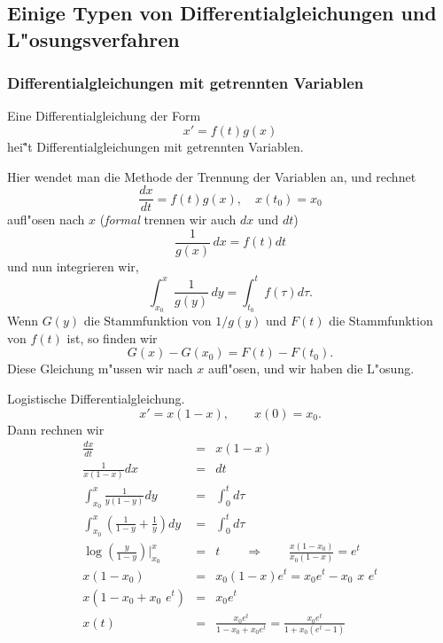 \subsection{Einige Typen von  Differentialgleichungen und L"osungsverfahren}
\subsubsection{Differentialgleichungen mit getrennten Variablen}
\begin{sdefi} Eine Differentialgleichung der Form
$$ x' = f(t) g(x)$$
hei\""{}t Differentialgleichungen mit getrennten Variablen.
\end{sdefi}
Hier wendet man die Methode der Trennung der Variablen an, und rechnet
$$ \frac {d x}{dt} = f(t) g(x),\quad x(t_0) = x_0$$
aufl"osen nach $x$ ({\it formal} trennen wir auch $dx$ und $dt$)
$$ \frac {1}{g(x)}\, dx = f(t) dt$$
und nun integrieren wir,
$$ \int_{x_0}^x\frac {1}{g(y)}\, dy = \int_{t_0}^tf(\tau) d\tau.$$
Wenn $G(y)$ die Stammfunktion von $1/g(y)$ und $F(t)$ die Stammfunktion von $f(t)$ ist,
so finden wir
$$ G(x)-G(x_0) = F(t)-F(t_0).$$
Diese Gleichung m"ussen wir nach $x$ aufl"osen, und wir haben die L"osung.
\begin{bspX}
Logistische Differentialgleichung.
$$ x' = x(1-x),\qquad x(0) = x_0.$$
Dann rechnen wir
\begin{eqnarray*}
\frac {dx}{dt} & = & x (1-x)\\
\frac {1}{x(1-x)}dx & = & dt\\
\int_{x_0}^x  \frac {1}{y(1-y)}dy & = & \int_0^td\tau\\
\int_{x_0}^x  \left(\frac {1}{1-y} +\frac{1}{y}\right) dy & = & \int_0^td\tau\\
\log(\frac{y}{1-y})\bigg|_{x_0}^x   & = & t
\qquad\Rightarrow\qquad
\frac{x(1-x_0)}{x_0(1-x)} = e^t\\
x(1-x_0) &=& x_0(1-x)e^t = x_0 e^t- x_0\,\, x\,\, e^t\\
x\left(1-x_0+x_0\,\, e^t\right) &=& x_0 e^t
\\
x(t)
 &=& \frac{x_0 e^t}{1-x_0+x_0e^t} 
 = \frac{x_0 e^t}{1+x_0(e^t-1)} 
\end{eqnarray*}
\end{bspX}
\begin{auf}\chc\label{block5A1}

\end{auf}
